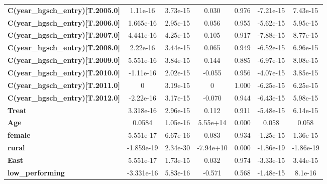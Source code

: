 \begin{center}
\begin{tabular}{lcccccc}
\textbf{C(year\_hgsch\_entry)[T.2005.0]} &     1.11e-16  &     3.73e-15     &     0.030  &         0.976        &    -7.21e-15    &     7.43e-15     \\
\textbf{C(year\_hgsch\_entry)[T.2006.0]} &    1.665e-16  &     2.95e-15     &     0.056  &         0.955        &    -5.62e-15    &     5.95e-15     \\
\textbf{C(year\_hgsch\_entry)[T.2007.0]} &    4.441e-16  &     4.25e-15     &     0.105  &         0.917        &    -7.88e-15    &     8.77e-15     \\
\textbf{C(year\_hgsch\_entry)[T.2008.0]} &     2.22e-16  &     3.44e-15     &     0.065  &         0.949        &    -6.52e-15    &     6.96e-15     \\
\textbf{C(year\_hgsch\_entry)[T.2009.0]} &    5.551e-16  &     3.84e-15     &     0.144  &         0.885        &    -6.97e-15    &     8.08e-15     \\
\textbf{C(year\_hgsch\_entry)[T.2010.0]} &    -1.11e-16  &     2.02e-15     &    -0.055  &         0.956        &    -4.07e-15    &     3.85e-15     \\
\textbf{C(year\_hgsch\_entry)[T.2011.0]} &            0  &     3.19e-15     &         0  &         1.000        &    -6.25e-15    &     6.25e-15     \\
\textbf{C(year\_hgsch\_entry)[T.2012.0]} &    -2.22e-16  &     3.17e-15     &    -0.070  &         0.944        &    -6.43e-15    &     5.98e-15     \\
\textbf{Treat}                           &    3.318e-16  &     2.96e-15     &     0.112  &         0.911        &    -5.48e-15    &     6.14e-15     \\
\textbf{Age}                             &       0.0584  &     1.05e-16     &  5.55e+14  &         0.000        &        0.058    &        0.058     \\
\textbf{female}                          &    5.551e-17  &     6.67e-16     &     0.083  &         0.934        &    -1.25e-15    &     1.36e-15     \\
\textbf{rural}                           &   -1.859e-19  &     2.34e-30     & -7.94e+10  &         0.000        &    -1.86e-19    &    -1.86e-19     \\
\textbf{East}                            &    5.551e-17  &     1.73e-15     &     0.032  &         0.974        &    -3.33e-15    &     3.44e-15     \\
\textbf{low\_performing}                 &   -3.331e-16  &     5.83e-16     &    -0.571  &         0.568        &    -1.48e-15    &      8.1e-16     \\

\end{tabular}
\end{center}
